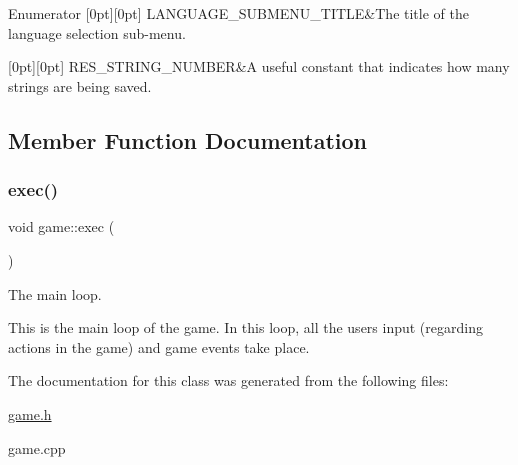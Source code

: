 \begin{DoxyEnumFields}{Enumerator}
[0pt][0pt]{}\mbox{\label{classgame_a750823afdadfbde9c945b9d0703c499da0da02304fc17f5e8de20c354600224cb}} 
L\+A\+N\+G\+U\+A\+G\+E\+\_\+\+S\+U\+B\+M\+E\+N\+U\+\_\+\+T\+I\+T\+LE&The title of the language selection sub-\/menu. \\
\hline

[0pt][0pt]{}\mbox{\label{classgame_a750823afdadfbde9c945b9d0703c499da9fc16aaae3b7622481465a27e7908aa6}} 
R\+E\+S\+\_\+\+S\+T\+R\+I\+N\+G\+\_\+\+N\+U\+M\+B\+ER&A useful constant that indicates how many strings are being saved. \\
\hline

\end{DoxyEnumFields}


\subsection{Member Function Documentation}
\mbox{\label{classgame_af1ca264f9c412dc05d7e1d4cfcb3dac2}} 
\subsubsection{\texorpdfstring{exec()}{exec()}}
{\footnotesize\ttfamily void game\+::exec (\begin{DoxyParamCaption}{ }\end{DoxyParamCaption})\hspace{0.3cm}{\ttfamily [protected]}}



The main loop. 

This is the main loop of the game. In this loop, all the user\textquotesingle{}s input (regarding actions in the game) and game events take place. 

The documentation for this class was generated from the following files\+:\begin{DoxyCompactItemize}
\item 
\mbox{\hyperlink{game_8h}{game.\+h}}\item 
game.\+cpp\end{DoxyCompactItemize}
